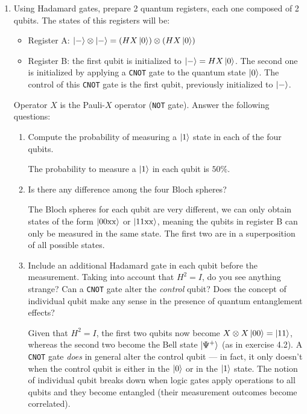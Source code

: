 \documentclass[11pt]{article}
\begin{document}
\begin{enumerate}[label*=\arabic*.]
\begin{enumerate}[label*=\arabic*.]
\begin{enumerate}[label*=\arabic*.]
\begin{enumerate}[label=(\alph*)]
    \end{enumerate}
    \item Using Hadamard gates, prepare 2 quantum registers, each one composed of 2 qubits. The states of
this registers will be:
\begin{itemize}
    \item Register A: $\ket{-}\otimes\ket{-}=(HX\ket{0})\otimes (HX\ket{0})$
    \item  Register B: the first qubit is initialized to $\ket{-}=HX\ket{0}$. The second one is initialized by applying a \texttt{CNOT} gate to the quantum state $\ket{0}$. The control of this \texttt{CNOT} gate is the first qubit, previously initialized to $\ket{-}$.
\end{itemize}
Operator $X$ is the Pauli-$X$ operator (\texttt{NOT} gate). Answer the following questions:
\begin{enumerate}[label=(\alph*)]
 \item Compute the probability of measuring a $\ket{1}$ state in each of the four qubits.

The probability to measure a $\ket{1}$ in each qubit is $50\%$.
 
 \item Is there any difference among the four Bloch spheres?

The Bloch spheres for each qubit are very different, we can only obtain states of the form $\ket{00\mathrm{xx}}$ or $\ket{11\mathrm{xx}}$, meaning the qubits in register B can only be measured in the same state. The first two are in a superposition of all possible states.
 
 \item Include an additional Hadamard gate in each qubit before the measurement. Taking into
account that $H^2 = I$, do you see anything strange? Can a \texttt{CNOT} gate alter the \textit{control} qubit?
Does the concept of individual qubit make any sense in the presence of quantum entanglement
effects?

Given that $H^2=I$, the first two qubits now become $X\otimes X\ket{00}=\ket{11}$, whereas the second two become the Bell state $\ket{\Psi^+}$ (as in exercise 4.2). A \texttt{CNOT} gate \textit{does} in general alter the control qubit --- in fact, it only doesn't when the control qubit is either in the $\ket{0}$ or in the $\ket{1}$ state. The notion of individual qubit breaks down when logic gates apply operations to all qubits and they become entangled (their measurement outcomes become correlated).


\end{enumerate}
\end{enumerate}
\end{enumerate}
\end{enumerate}
\end{document}
